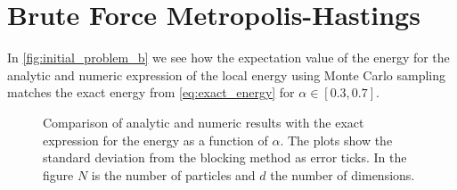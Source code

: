 \documentclass[
    a4paper, aps, twocolumn, floatfix, superscriptaddress,
    nofootinbib]{revtex4-1}
\newcommand{\1}{\mathds{1}}
\begin{document}
\section{Brute Force Metropolis-Hastings}
    In \autoref{fig:initial_problem_b} we see how the expectation value of the
    energy for the analytic and numeric expression of the local energy using
    Monte Carlo sampling matches the exact energy from \autoref{eq:exact_energy}
    for $\alpha \in [0.3, 0.7]$.
    \begin{figure}[b]
        \caption{Comparison of analytic and numeric results with the exact
        expression for the energy as a function of $\alpha$. The plots show the
        standard deviation from the blocking method as error ticks. In the
        figure $N$ is the number of particles and $d$ the number of dimensions.}
        \label{fig:initial_problem_b}
        \vspace{2cm}
    \end{figure}
\end{document}
